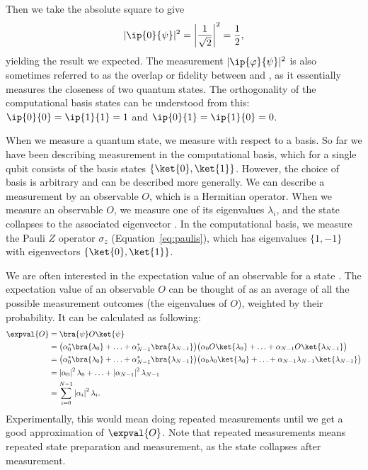 \documentclass[a4paper,10pt]{article}
\begin{document}
Then we take the absolute square to give
\begin{equation}
\lvert \ip{0}{\psi} \rvert^2 = \left\lvert \dfrac{1}{\sqrt2} \right\rvert^2 = \dfrac{1}{2},
\end{equation}
yielding the result we expected.
The measurement $\lvert\ip{\varphi}{\psi}\rvert^2$ is also sometimes referred to as the overlap or fidelity between \ket{\psi} and \ket{\varphi}, as it essentially measures the closeness of two quantum states.
The orthogonality of the computational basis states can be understood from this: $\ip{0}{0} = \ip{1}{1} = 1$ and $\ip{0}{1} = \ip{1}{0} = 0$.

When we measure a quantum state, we measure with respect to a basis.
So far we have been describing measurement in the computational basis, which for a single qubit consists of the basis states $\{\ket{0}, \ket{1}\}$.
However, the choice of basis is arbitrary and can be described more generally.
We can describe a measurement by an observable $O$, which is a Hermitian operator.
When we measure an observable $O$, we measure one of its eigenvalues $\lambda_i$, and the state collapses to the associated eigenvector .
In the computational basis, we measure the Pauli $Z$ operator $\sigma_z$ (Equation~\ref{eq:paulis}), which has eigenvalues $\{1, -1\}$ with eigenvectors $\{\ket{0}, \ket{1}\}$.

We are often interested in the expectation value of an observable for a state \ket{\psi}.
The expectation value  of an observable $O$ can be thought of as an average of all the possible measurement outcomes (the eigenvalues of $O$), weighted by their probability.
It can be calculated as following:
\begin{equation}
\begin{aligned}
\expval{O} &= \bra{\psi}O\ket{\psi} \\
&= \big(\alpha_0^*\bra{\lambda_0} + \ldots + \alpha_{N-1}^*\bra{\lambda_{N-1}}\big) \big(\alpha_0O\ket{\lambda_0} + \ldots + \alpha_{N-1}O\ket{\lambda_{N-1}}\big) \\
&= \big(\alpha_0^*\bra{\lambda_0} + \ldots + \alpha_{N-1}^*\bra{\lambda_{N-1}}\big) \big(\alpha_0\lambda_0\ket{\lambda_0} + \ldots + \alpha_{N-1}\lambda_{N-1}\ket{\lambda_{N-1}}\big) \\
&=  \left\lvert \alpha_0\right\rvert^2\lambda_0 + \ldots + \left\lvert \alpha_{N-1}\right\rvert^2 \lambda_{N-1} \\
&= \sum_{i=0}^{N-1} \left\lvert \alpha_i\right\rvert^2\lambda_i.
\end{aligned}
\end{equation}
Experimentally, this would mean doing repeated measurements until we get a good approximation of $\expval{O}$.
Note that repeated measurements means repeated state preparation and measurement, as the state collapses after measurement.
\end{document}
